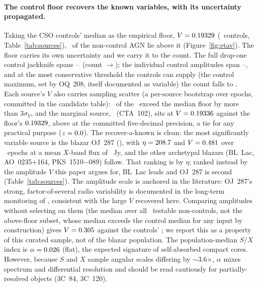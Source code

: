 \documentclass[twocolumn]{aastex631}
\begin{document}
\paragraph{The control floor recovers the known variables, with its uncertainty propagated.} Taking
the CSO controls' median as the empirical floor, $V=0.19329$ (\viNctrl\ controls,
Table~\ref{tab:sources}), \viNabove\ of the non-control AGN lie above it (Figure~\ref{fig:etav}).
The floor carries its own uncertainty and we carry it to the count. The full drop-one control
jackknife spans \viFloorJkLo--\viFloorJkHi\ (count \viNaboveJkHi$\to$\viNaboveJkLo); the individual
control amplitudes span \viCtrlVmin--\viCtrlVmax, and at the most conservative threshold the controls can supply (the control maximum, set by OQ~208, itself documented as variable) the count falls to \viNaboveCtrlMax. Each source's $V$ also carries sampling scatter (a per-source
bootstrap over epochs, committed in the candidate table): \viNaboveZthree\ of the \viNabove\ exceed
the median floor by more than $3\sigma_V$, and the marginal source, \viMarginalName\ (CTA~102), sits at $V=0.19336$ against the floor's $0.19329$, above at the committed five-decimal precision, a tie for any practical purpose ($z=0.0$).
The recover-a-known is clean: the most significantly variable source is the blazar OJ~287
(\viTopName), with $\eta=208.7$ and $V=0.481$ over \viTopEpochs\ epochs at a mean $X$-band flux
of \viTopFlux~Jy, and the other archetypal blazars (BL~Lac, AO~0235+164, PKS~1510$-$089) follow.
That ranking is by $\eta$; ranked instead by the amplitude $V$ this paper argues for, BL~Lac leads
and OJ~287 is second (Table~\ref{tab:sources}). The amplitude scale is anchored in the literature:
OJ~287's strong, factor-of-several radio variability is documented in the long-term monitoring of
\citet{komossa2023}, consistent with the large $V$ recovered here. Comparing amplitudes without selecting on them (the median over all \viNnoncontrol\ testable non-controls, not the
above-floor subset, whose median exceeds the control median for any input by construction) gives $V=0.305$ against the controls' \viMedVctrl; we report this as a
property of this curated sample, not of the blazar population. The population-median $S/X$ index is
$\alpha=0.026$ (flat), the expected signature of self-absorbed compact cores. However, because
$S$ and $X$ sample angular scales differing by $\sim$3.6$\times$, $\alpha$ mixes spectrum and
differential resolution and should be read cautiously for partially-resolved objects (3C~84, 3C~120).
\end{document}
